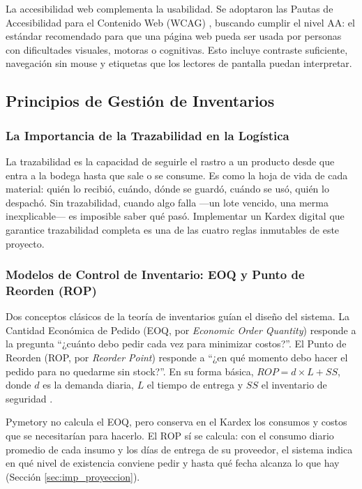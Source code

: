 La accesibilidad web complementa la usabilidad. Se adoptaron las Pautas de Accesibilidad para el Contenido Web (WCAG) \cite{w3c_wcag_overview}, buscando cumplir el nivel AA: el estándar recomendado para que una página web pueda ser usada por personas con dificultades visuales, motoras o cognitivas. Esto incluye contraste suficiente, navegación sin mouse y etiquetas que los lectores de pantalla puedan interpretar.

\subsection{Principios de Gestión de Inventarios}
\label{sec:principios_gestion}

\subsubsection{La Importancia de la Trazabilidad en la Logística}
\label{sssec:trazabilidad}

La trazabilidad es la capacidad de seguirle el rastro a un producto desde que entra a la bodega hasta que sale o se consume. Es como la hoja de vida de cada material: quién lo recibió, cuándo, dónde se guardó, cuándo se usó, quién lo despachó. Sin trazabilidad, cuando algo falla ---un lote vencido, una merma inexplicable--- es imposible saber qué pasó. Implementar un Kardex digital que garantice trazabilidad completa es una de las cuatro reglas inmutables de este proyecto.

\subsubsection{Modelos de Control de Inventario: EOQ y Punto de Reorden (ROP)}
\label{sssec:eoq_rop}

Dos conceptos clásicos de la teoría de inventarios guían el diseño del sistema. La Cantidad Económica de Pedido (EOQ, por \textit{Economic Order Quantity}) responde a la pregunta ``¿cuánto debo pedir cada vez para minimizar costos?''. El Punto de Reorden (ROP, por \textit{Reorder Point}) responde a ``¿en qué momento debo hacer el pedido para no quedarme sin stock?''. En su forma básica, $ROP = d \times L + SS$, donde $d$ es la demanda diaria, $L$ el tiempo de entrega y $SS$ el inventario de seguridad \cite{ballou2004logistica}.

Pymetory no calcula el EOQ, pero conserva en el Kardex los consumos y costos que se necesitarían para hacerlo. El ROP sí se calcula: con el consumo diario promedio de cada insumo y los días de entrega de su proveedor, el sistema indica en qué nivel de existencia conviene pedir y hasta qué fecha alcanza lo que hay (Sección \ref{sec:imp_proyeccion}).

